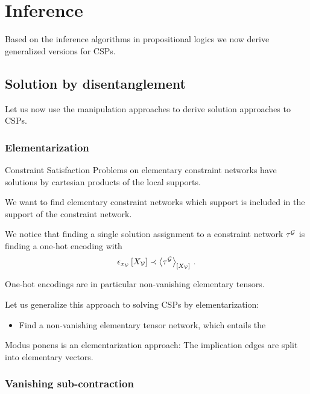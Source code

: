 \section{Inference}

Based on the inference algorithms in propositional logics we now derive generalized versions for CSPs.

%



\subsection{Solution by disentanglement}

Let us now use the manipulation approaches to derive solution approaches to CSPs.

\subsubsection{Elementarization}

Constraint Satisfaction Problems on elementary constraint networks have solutions by cartesian products of the local supports.

We want to find elementary constraint networks which support is included in the support of the constraint network.

We notice that finding a single solution assignment to a constraint network $\tau^{\mathcal{G}}$ is finding a one-hot encoding with
\begin{align*}
    \epsilon_{x_{\mathcal{V}}}\left[X_{\mathcal{V}}\right]
    \prec
    \left\langle \tau^{\mathcal{G}}\right\rangle_{\left[ X_{\mathcal{V}} \right]} \, .
\end{align*}

One-hot encodings are in particular non-vanishing elementary tensors.

Let us generalize this approach to solving CSPs by elementarization:
\begin{itemize}
    \item Find a non-vanishing elementary tensor network, which entails the
\end{itemize}

Modus ponens is an elementarization approach: The implication edges are split into elementary vectors.

\subsubsection{Vanishing sub-contraction}

